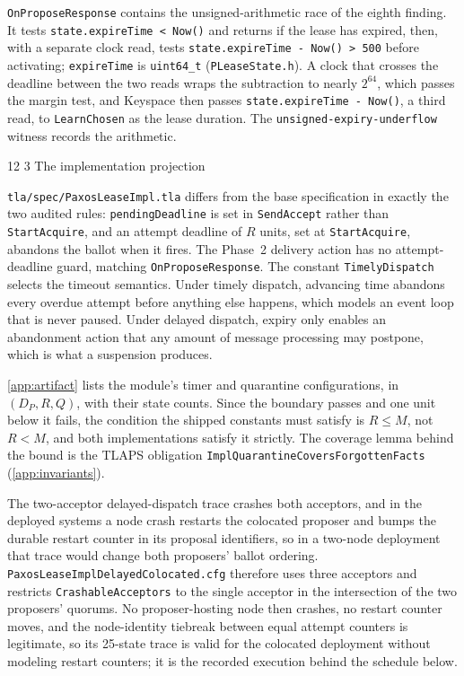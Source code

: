 \documentclass[final,5p,times,twocolumn,number]{elsarticle}
\makeatletter
\newcommand{\code}[1]{\texttt{#1}}
\renewcommand\subsection{\@startsection{subsection}{2}{\z@}%
           {12\p@ \@plus 6\p@ \@minus 3\p@}%
           {3\p@ \@plus 6\p@ \@minus 3\p@}%
           {\normalfont\normalsize\bfseries}}
\makeatother
\begin{document}
\code{OnProposeResponse} contains the unsigned-arithmetic race of the eighth finding.  It tests \code{state.expireTime < Now()} and returns if the lease has expired, then, with a separate clock read, tests \code{state.expireTime - Now() > 500} before activating; \code{expireTime} is \code{uint64\_t} (\code{PLeaseState.h}).  A clock that crosses the deadline between the two reads wraps the subtraction to nearly $2^{64}$, which passes the margin test, and Keyspace then passes \code{state.expireTime - Now()}, a third read, to \code{LearnChosen} as the lease duration.  The \code{unsigned-expiry-underflow} witness records the arithmetic.

\subsection{The implementation projection}

\code{tla/spec/PaxosLeaseImpl.tla} differs from the base specification in exactly the two audited rules: \code{pendingDeadline} is set in \code{SendAccept} rather than \code{StartAcquire}, and an attempt deadline of $R$ units, set at \code{StartAcquire}, abandons the ballot when it fires.  The Phase~2 delivery action has no attempt-deadline guard, matching \code{OnProposeResponse}.  The constant \code{TimelyDispatch} selects the timeout semantics.  Under timely dispatch, advancing time abandons every overdue attempt before anything else happens, which models an event loop that is never paused.  Under delayed dispatch, expiry only enables an abandonment action that any amount of message processing may postpone, which is what a suspension produces.

\ref{app:artifact} lists the module's timer and quarantine configurations, in $(D_P, R, Q)$, with their state counts.  Since the boundary passes and one unit below it fails, the condition the shipped constants must satisfy is $R \leq M$, not $R < M$, and both implementations satisfy it strictly.  The coverage lemma behind the bound is the TLAPS obligation \code{ImplQuarantineCoversForgottenFacts} (\ref{app:invariants}).

The two-acceptor delayed-dispatch trace crashes both acceptors, and in the deployed systems a node crash restarts the colocated proposer and bumps the durable restart counter in its proposal identifiers, so in a two-node deployment that trace would change both proposers' ballot ordering.  \code{PaxosLeaseImplDelayedColocated.cfg} therefore uses three acceptors and restricts \code{CrashableAcceptors} to the single acceptor in the intersection of the two proposers' quorums.  No proposer-hosting node then crashes, no restart counter moves, and the node-identity tiebreak between equal attempt counters is legitimate, so its 25-state trace is valid for the colocated deployment without modeling restart counters; it is the recorded execution behind the schedule below.
\end{document}
